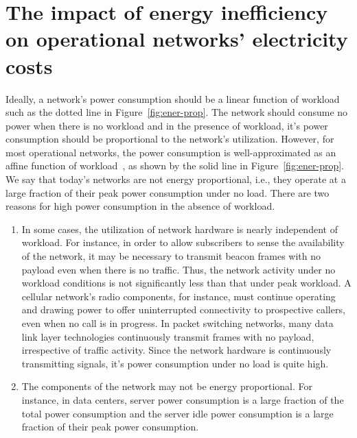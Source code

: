 \section{The impact of energy inefficiency on operational networks' electricity costs} 

Ideally, a network's power consumption should be a linear function of workload such as the dotted line in Figure~\ref{fig:ener-prop}. The network should consume no power when there is no workload and in the presence of workload, it's power consumption should be proportional to the network's utilization. However, for most operational networks, the power consumption is well-approximated as an affine function of workload~\cite{Peng:2011:TPS:2030613.2030628,Fan:power:ICSA:2007}, as shown by the solid line in Figure~\ref{fig:ener-prop}. We say that today's networks are not energy proportional, i.e., they operate at a large fraction of their peak power consumption under no load. There are two reasons for high power consumption in the absence of workload. 
\begin{enumerate}
\item In some cases, the utilization of network hardware is nearly independent of workload. For instance, in order to allow subscribers to sense the availability of the network, it may be necessary to transmit beacon frames with no payload even when there is no traffic. Thus, the network activity under no workload conditions is not significantly less than that under peak workload. A cellular network's radio components, for instance, must continue operating and drawing power to offer uninterrupted connectivity to prospective callers, even when no call is in progress. In packet switching networks, many data link layer technologies continuously transmit frames with no payload, irrespective of traffic activity. Since the network hardware is continuously transmitting signals, it's power consumption under no load is quite high.
\item The components of the network may not be energy proportional. For instance, in data centers, server power consumption is a large fraction of the total power consumption and the server idle power consumption is a large fraction of their peak power consumption. 
\end{enumerate}

